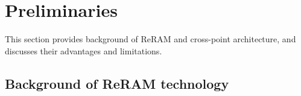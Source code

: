 \section{Preliminaries}\label{sec:preliminary}

This section provides background of ReRAM and cross-point architecture,
and discusses their advantages and limitations.

\subsection{Background of ReRAM technology}
%

